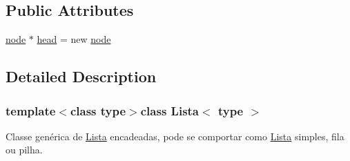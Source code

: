 \subsection*{Public Attributes}
\begin{DoxyCompactItemize}
\item 
\hyperlink{structLista_1_1node}{node} $\ast$ \hyperlink{classLista_acc29e448aa48540bb4f070661a52bc60}{head} = new \hyperlink{structLista_1_1node}{node}
\end{DoxyCompactItemize}


\subsection{Detailed Description}
\subsubsection*{template$<$class type$>$class Lista$<$ type $>$}

Classe genérica de \hyperlink{classLista}{Lista} encadeadas, pode se comportar como \hyperlink{classLista}{Lista} simples, fila ou pilha. 

